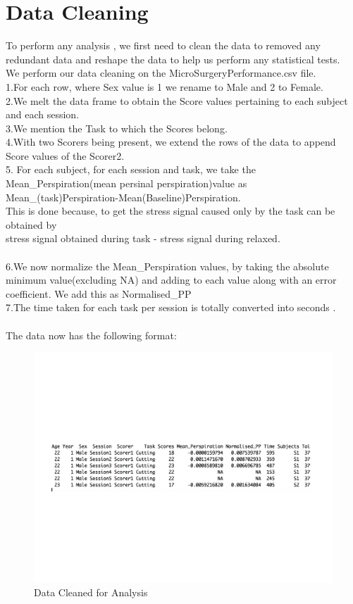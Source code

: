 \documentclass[12pt,epsf]{report}
\begin{document}
\section*{Data Cleaning}
{To perform any analysis , we first need to clean the data to removed any redundant data and reshape the data to help us perform any statistical tests.\\
We perform our data cleaning on the MicroSurgeryPerformance.csv file.\\
1.For each row, where Sex value is 1 we rename to Male and 2 to Female.\\
2.We melt the data frame to obtain the Score values pertaining to each subject and each session.\\
3.We mention the Task to which the Scores belong.\\
4.With two Scorers being present, we extend the rows of the data to append Score values of the Scorer2.\\
5. For each subject, for each session and task, we take the Mean\_Perspiration(mean persinal perspiration)value as Mean\_(task)Perspiration-Mean(Baseline)Perspiration. \\
This is done because, to get the stress signal caused only by the task can be obtained by \\
stress signal obtained during task - stress signal during relaxed.\\
\\
6.We now normalize the Mean\_Perspiration values, by taking the absolute minimum value(excluding NA) and adding to each value along with an error coefficient. We add this as Normalised\_PP\\
7.The time taken for each task per session is totally converted into seconds .\\
\\
The data  now has the following format:\\
\begin{figure}[!htb]
	\includegraphics[width=1.1\textwidth]{New_data.pdf}
	\caption{Data Cleaned for Analysis}
\end{figure}
\newpage
}
\end{document}
